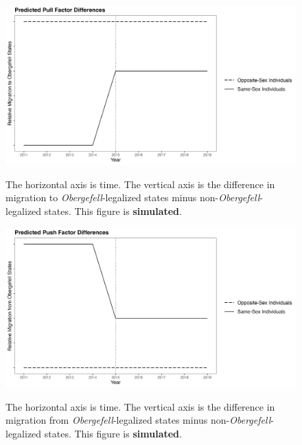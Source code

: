 \documentclass[12pt,letterpaper]{article}
\begin{document}
\begin{figure}[htbp]
    \centering
    \caption{}
    \label{fig: ex_post_diffs}
    \includegraphics[width=0.75\linewidth]{outputs/summary_stats/ex_post_diffs.png}

    \vspace{0.5em}
    \begin{minipage}{0.75\linewidth}
        \footnotesize The horizontal axis is time. The vertical axis is the difference in migration to \textit{Obergefell}-legalized states minus non-\textit{Obergefell}-legalized states. This figure is \textbf{simulated}.
    \end{minipage}
\end{figure}

\begin{figure}[htbp]
    \centering
    \caption{}
    \label{fig: ex_ante_diffs}
    \includegraphics[width=0.75\linewidth]{outputs/summary_stats/ex_ante_diffs.png}

    \vspace{0.5em}
    \begin{minipage}{0.75\linewidth}
        \footnotesize The horizontal axis is time. The vertical axis is the difference in migration from \textit{Obergefell}-legalized states minus non-\textit{Obergefell}-legalized states. This figure is \textbf{simulated}.
    \end{minipage}
\end{figure}
\end{document}
